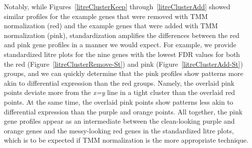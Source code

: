 \documentclass{article}
\begin{document}
\begin{enumerate}
  Notably, while Figures~\ref{litreClusterKeep} through~\ref{litreClusterAdd} showed similar profiles for the example genes that were removed with TMM normalization (red) and the example genes that were added with TMM normalization (pink), standardization amplifies the differences between the red and pink gene profiles in a manner we would expect. For example, we provide standardized litre plots for the nine genes with the lowest FDR values for both the red (Figure~\ref{litreClusterRemove-St}) and pink (Figure~\ref{litreClusterAdd-St}) groups, and we can quickly determine that the pink profiles show patterns more akin to differential expression than the red groups. Namely, the overlaid pink points deviate more from the \textit{x=y} line in a tight cluster than the overlaid red points. At the same time, the overlaid pink points show patterns less akin to differential expression than the purple and orange points. All together, the pink gene profiles appear as an intermediate between the clean-looking purple and orange genes and the messy-looking red genes in the standardized litre plots, which is to be expected if TMM normalization is the more appropriate technique.
  
  \end{enumerate}
  
\end{document}
